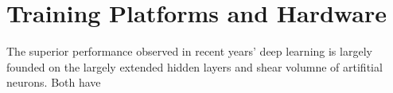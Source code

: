\section{Training Platforms and Hardware}
The superior performance observed in recent years' deep learning is largely founded on the largely extended hidden layers and shear volumne of artifitial neurons. Both have 